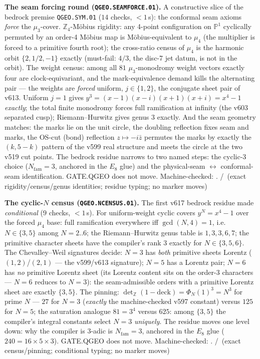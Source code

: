 \par\smallskip\noindent\textbf{The seam forcing round
(\texttt{QGEO.SEAMFORCE.01}).}
A constructive slice of the bedrock premise \texttt{QGEO.SYM.01}
($14$ checks, ${<}1$\,s): the conformal seam axioms \emph{force} the
$\mu_3$-cover.  $\mathbb{Z}_4$-M\"obius rigidity: any 4-point
configuration on $\mathbb{P}^1$ cyclically permuted by an order-4
M\"obius map is M\"obius-equivalent to $\mu_4$ (the multiplier is
forced to a primitive fourth root); the cross-ratio census of $\mu_4$
is the harmonic orbit $\{2,1/2,-1\}$ exactly (must-fail: $4/3$, the
disc-7 jet datum, is not in the orbit).  The weight census: among all
$81$ $\mu_3$-monodromy weight vectors exactly four are
clock-equivariant, and the mark-equivalence demand kills the
alternating pair --- the weights are \emph{forced} uniform,
$j\in\{1,2\}$, the conjugate sheet pair of v613.  Uniform $j=1$ gives
$y^3=(x-1)(x-i)(x+1)(x+i)=x^4-1$ \emph{exactly}; the total finite
monodromy forces full ramification at infinity (the v603 separated
cusp); Riemann--Hurwitz gives genus $3$ exactly.  And the seam
geometry matches: the marks lie on the unit circle, the doubling
reflection fixes seam and marks, the OS-cut (bond) reflection
$z\mapsto-i\bar z$ permutes the marks by exactly the $(k,5{-}k)$
pattern of the v599 real structure and meets the circle at the two
v519 cut points.  The bedrock residue narrows to two named steps: the
cyclic-3 choice ($N_{\mathrm{fam}}=3$, anchored in the $E_8$ glue)
and the physical-seam $\leftrightarrow$ conformal-seam
identification.  GATE.QGEO does not move.
Machine-checked: .
\mE/\mC\ (exact rigidity/census/genus identities; residue typing;
no marker moves)
\par\smallskip

\par\smallskip\noindent\textbf{The cyclic-$N$ census
(\texttt{QGEO.NCENSUS.01}).}
The first v617 bedrock residue made \emph{conditional} ($9$ checks,
${<}1$\,s).  For uniform-weight cyclic covers $y^N=x^4-1$ over the
forced $\mu_4$ base: full ramification everywhere iff
$\gcd(N,4)=1$, i.e.\ $N\in\{3,5\}$ among $N=2..6$; the
Riemann--Hurwitz genus table is $1,3,3,6,7$; the primitive character
sheets have the compiler's rank $3$ exactly for $N\in\{3,5,6\}$.
The Chevalley--Weil signatures decide: $N=3$ has \emph{both}
primitive sheets Lorentz ($(1,2)$/$(2,1)$ --- the v599/v613
signature); $N=5$ has a Lorentz pair; $N=6$ has \emph{no} primitive
Lorentz sheet (its Lorentz content sits on the order-3 characters
--- $N=6$ reduces to $N=3$): the seam-admissible orders with a
primitive Lorentz sheet are exactly $\{3,5\}$.  The pinning:
$\det_{\mathbb Z}(1-\mathrm{deck})=\Phi_N(1)^3=N^3$ for prime $N$
--- $27$ for $N=3$ (\emph{exactly} the machine-checked v597
constant) versus $125$ for $N=5$; the saturation analogue $81=3^4$
versus $625$: among $\{3,5\}$ the compiler's integral constants
select $N=3$ \emph{uniquely}.  The residue moves one level down: why
the compiler is 3-adic is $N_{\mathrm{fam}}=3$, anchored in the
$E_8$ glue ($240=16\times5\times3$).  GATE.QGEO does not move.
Machine-checked: .
\mE/\mC\ (exact census/pinning; conditional typing; no marker moves)
\par\smallskip
